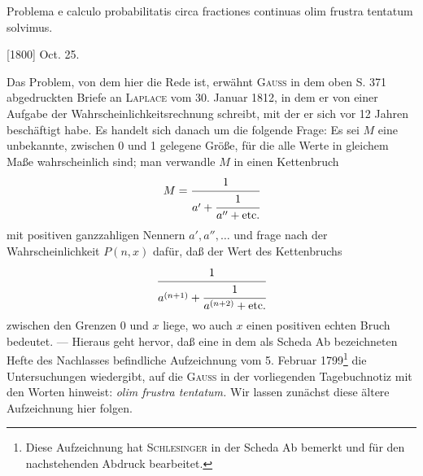 \noindent\hspace*{\parindent}Problema e calculo probabilitatis circa fractiones continuas olim frustra tentatum solvimus.
\par\noindent\hfill[1800] Oct. 25.

\par\medskip\begingroup\small
\renewcommand{\thefootnote}{***)}
\noindent\hspace*{\parindent}Das Problem, von dem hier die Rede ist, erwähnt \textsc{Gauss} in dem oben S. 371 abgedruckten Briefe an \textsc{Laplace} vom 30. Januar 1812, in dem er von einer Aufgabe der Wahrscheinlichkeitsrechnung schreibt, mit der er sich vor 12 Jahren beschäftigt habe. Es handelt sich danach um die folgende Frage: Es sei \(M\) eine unbekannte, zwischen 0 und 1 gelegene Größe, für die alle Werte in gleichem Maße wahrscheinlich sind; man verwandle \(M\) in einen Kettenbruch
\[
M=\cfrac1{a'+\cfrac1{a''+\text{etc.}}}
\]
\noindent mit positiven ganzzahligen Nennern \(a',a'',\ldots\) und frage nach der Wahrscheinlichkeit \(P(n,x)\) dafür, daß der Wert des Kettenbruchs
\[
\cfrac1{a^{(n+1)}+\cfrac1{a^{(n+2)}+\text{etc.}}}
\]
\noindent zwischen den Grenzen 0 und \(x\) liege, wo auch \(x\) einen positiven echten Bruch bedeutet. — Hieraus geht hervor, daß eine in dem als Scheda Ab bezeichneten Hefte des Nachlasses befindliche Aufzeichnung vom 5. Februar 1799\footnote{Diese Aufzeichnung hat \textsc{Schlesinger} in der Scheda Ab bemerkt und für den nachstehenden Abdruck bearbeitet.} die Untersuchungen wiedergibt, auf die \textsc{Gauss} in der vorliegenden Tagebuchnotiz mit den Worten hinweist: \textit{olim frustra tentatum.} Wir lassen zunächst diese ältere Aufzeichnung hier folgen.
\par\endgroup

